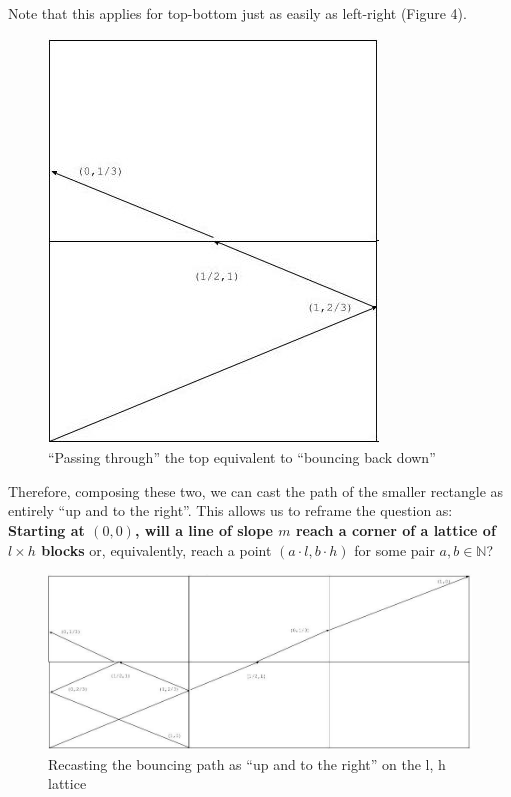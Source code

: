 \documentclass[11pt, oneside]{article} 	%
\begin{document}
Note that this applies for top-bottom just as easily as left-right (Figure 4). 

\begin{figure}[!htb]
\centering
\includegraphics[scale=.5]{mirrorup}
 \caption{``Passing through'' the top equivalent to ``bouncing back down''}
\end{figure}

Therefore, composing these two, we can cast the path of the smaller rectangle as entirely ``up and to the right''. This allows us to reframe the question as: \textbf{Starting at $(0,0)$, will a line of slope $m$ reach a corner of a lattice of $l \times h$ blocks} or, equivalently, reach a point $(a \cdot l, b \cdot h)$ for some pair $a,b \in \mathbb{N}$?

\begin{figure}[!htb]
\centering
\includegraphics[scale=.4]{fullpath}
 \caption{Recasting the bouncing path as ``up and to the right'' on the l, h lattice}
\end{figure}
\end{document}
